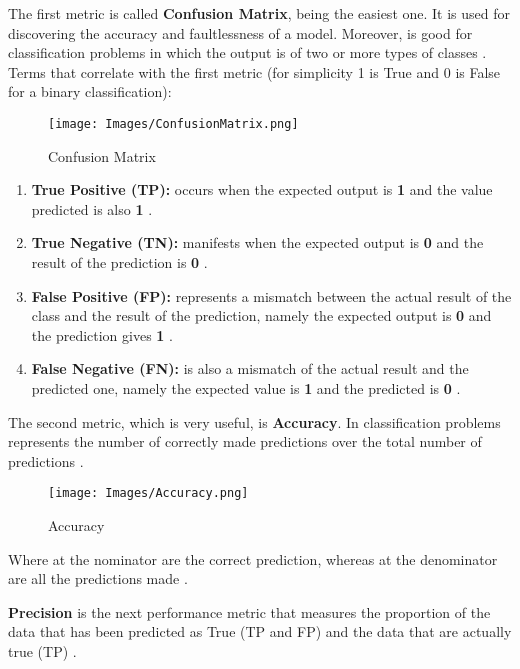 The first metric is called \textbf{Confusion Matrix}, being the easiest one. It is used for discovering the accuracy and faultlessness of a model. Moreover, is good for classification problems in which the output is of two or more types of classes \cite{Metrics}. Terms that correlate with the first metric (for simplicity 1 is True and 0 is False for a binary classification): 

\begin{figure}[h!]
    \centering
    \texttt{[image: Images/ConfusionMatrix.png]}
    \caption{Confusion Matrix \cite{Metrics}}
    \label{fig:ConfusionMatrix}
\end{figure}

\begin{enumerate}
    \item \textbf{True Positive (TP):} occurs when the expected output is \textbf{1} and the value predicted is also \textbf{1} \cite{Metrics}.
    \item \textbf{True Negative (TN):} manifests when the expected output is \textbf{0} and the result of the prediction is \textbf{0} \cite{Metrics}.
    \item \textbf{False Positive (FP):} represents a mismatch between the actual result of the class and the result of the prediction, namely the expected output is \textbf{0} and the prediction gives \textbf{1} \cite{Metrics}.
    \item \textbf{False Negative (FN):} is also a mismatch of the actual result and the predicted one, namely the expected value is \textbf{1} and the predicted is \textbf{0} \cite{Metrics}.
\end{enumerate}

The second metric, which is very useful, is \textbf{Accuracy}. In classification problems represents the number of correctly made predictions over the total number of predictions \cite{Metrics}.

\begin{figure}[h!]
    \centering
    \texttt{[image: Images/Accuracy.png]}
    \caption{Accuracy \cite{Metrics}}
    \label{fig:Accuracy}
\end{figure}

Where at the nominator are the correct prediction, whereas at the denominator are all the predictions made \cite{Metrics}.

\textbf{Precision} is the next performance metric that measures the proportion of the data that has been predicted as True (TP and FP) and the data that are actually true (TP) \cite{Metrics}. 

